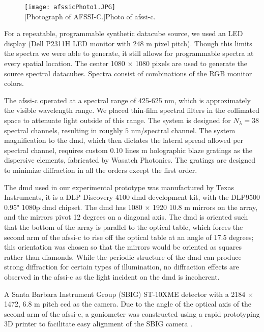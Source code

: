 \begin{figure}[htb]
	\centering
	\texttt{[image: afssicPhoto1.JPG]}\\
	[Photograph of AFSSI-C.]{Photo of \gls{afssi-c}. }
	\label{fig:afssicPhoto1}
\end{figure}

For a repeatable, programmable synthetic datacube source, we used an LED display (Dell P2311H LED monitor with 248 \textmu m pixel pitch). Though this limits the spectra we were able to generate, it still allows for programmable spectra at every spatial location. The center 1080 $\times$ 1080 pixels are used to generate the source spectral datacubes. Spectra consist of combinations of the RGB monitor colors.

The \gls{afssi-c} operated at a spectral range of 425-625 nm, which is approximately the visible wavelength range. We placed thin-film spectral filters in the collimated space to attenuate light outside of this range. The system is designed for $N_{\lambda} = 38$ spectral channels, resulting in roughly $5$ nm/spectral channel. The system magnification to the \gls{dmd}, which then dictates the lateral spread allowed per spectral channel, requires custom 0.10 lines \textmu m holographic blaze gratings as the dispersive elements, fabricated by Wasatch Photonics. The gratings are designed to minimize diffraction in all the orders except the first order. 

The \gls{dmd} used in our experimental prototype was manufactured by Texas Instruments, it is a DLP Discovery 4100 \gls{dmd} development kit, with the DLP9500 0.95" 1080p \gls{dmd} chipset. The \gls{dmd} has 1080 $\times$ 1920 10.8 \textmu m mirrors on the array, and the mirrors pivot 12 degrees on a diagonal axis. The \gls{dmd} is oriented such that the bottom of the array is parallel to the optical table, which forces the second arm of the \gls{afssi-c} to rise off the optical table at an angle of 17.5 degrees; this orientation was chosen so that the mirrors would be oriented as squares rather than diamonds. While the periodic structure of the \gls{dmd} can produce strong diffraction for certain types of illumination, no diffraction effects are observed in the \gls{afssi-c} as the light incident on the \gls{dmd} is incoherent. 

A Santa Barbara Instrument Group (SBIG) ST-10XME detector with a 2184 $\times$ 1472, 6.8  \textmu m pitch \gls{ccd} as the camera. Due to the angle of the optical axis of the second arm of the \gls{afssi-c}, a goniometer was constructed using a rapid prototyping 3D printer to facilitate easy alignment of the SBIG camera \cite{dunlop-gray2015phdthesis}.

